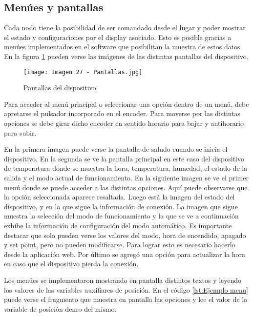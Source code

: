 \subsection{Menúes y pantallas}

Cada nodo tiene la posibilidad de ser comandado desde el lugar y poder mostrar el estado y configuraciones por el display asociado. Esto es posible gracias a menúes implementados en el software que posibilitan la muestra de estos datos. En la figura \ref{fig:27} pueden verse las imágenes de las distintas pantallas del dispositivo.

\begin{figure}[h]
\centering
\texttt{[image: Imagen 27 - Pantallas.jpg]}
\caption[Pantallas dispositivo]{Pantallas del dispositivo.}
\label{fig:27}
\end{figure}

Para acceder al menú principal o seleccionar una opción dentro de un menú, debe apretarse el pulsador incorporado en el encoder. Para moverse por las distintas opciones se debe girar dicho encoder en sentido horario para bajar y antihorario para subir.

En la primera imagen puede verse la pantalla de saludo cuando se inicia el dispositivo. En la segunda se ve la pantalla principal en este caso del dispositivo de temperatura donde se muestra la hora, temperatura, humedad, el estado de la salida y el modo actual de funcionamiento. En la siguiente imagen se ve el primer menú donde se puede acceder a las distintas opciones. Aquí puede observarse que la opción seleccionada aparece resaltada. Luego está la imagen del estado del dispositivo, y en la que sigue la información de conexión. La imagen que sigue muestra la selección del modo de funcionamiento y la que se ve a continuación exhibe la información de configuración del modo automático. Es importante destacar que solo pueden verse los valores del modo, hora de encendido, apagado y set point, pero no pueden modificarse. Para lograr esto es necesario hacerlo desde la aplicación web. Por último se agregó una opción para actualizar la hora en caso que el dispositivo pierda la conexión.

Los menúes se implementaron mostrando en pantalla distintos textos y leyendo los valores de las variables auxiliares de posición. En el código \ref{lst:Ejemplo menu} puede verse el fragmento que muestra en pantalla las opciones y lee el valor de la variable de posición denro del mismo.


